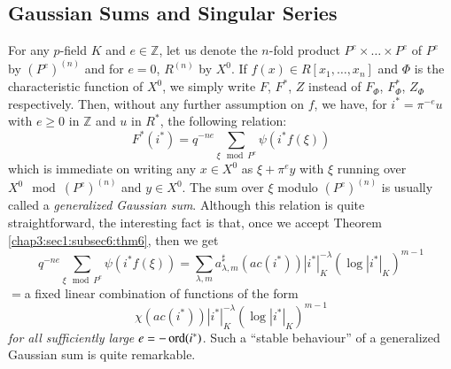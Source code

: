 \subsection{Gaussian Sums and Singular Series}\label{chap3:sec1:subsec7} %

For any $p$-field $K$ and $e\in\mathbb{Z}$, let us denote the $n$-fold
product $P^{e}\times\ldots\times P^{e}$ of $P^{e}$ by $(P^{e})^{(n)}$
and for $e=0$, $R^{(n)}$ by $X^{0}$. If $f(x)\in
R[x_{1},\ldots,x_{n}]$ and $\Phi$ is the characteristic function of
$X^{0}$, we simply write $F$, $F^{\ast}$, $Z$ instead of $F_{\Phi}$,
$F^{\ast}_{\Phi}$, $Z_{\Phi}$ respectively. Then, without any further
assumption on $f$, we have, for $i^{\ast}=\pi^{-e}u$ with $e\geq 0$ in
$\mathbb{Z}$ and $u$ in $R^{\ast}$, the following relation:
$$
F^{\ast}(i^{\ast})=q^{-ne}\sum_{\xi\mod P^{e}}\psi(i^{\ast}f(\xi))
$$
which is immediate on writing any $x\in X^{0}$ as $\xi+\pi^{e}y$ with
$\xi$ running over $X^{0}\mod(P^{e})^{(n)}$ and $y\in X^{0}$. The sum
over $\xi$ modulo $(P^{e})^{(n)}$ is usually called a {\em generalized
  Gaussian sum}. Although this relation is quite straightforward, the
interesting fact is that, once we accept Theorem
\ref{chap3:sec1:subsec6:thm6}, then we get
$$
q^{-ne}\sum_{\xi\mod
  P^{e}}\psi(i^{\ast}f(\xi))=\sum_{\lambda,m}a^{\sharp}_{\lambda,m} 
(ac(i^{\ast}))|i^{\ast}|^{-\lambda}_{K}(\log |i^{\ast}|_{K})^{m-1}
$$
$=$\pageoriginale a fixed linear combination of functions of the form
$$
\chi(ac(i^{\ast}))|i^{\ast}|^{-\lambda}_{K}(\log|i^{\ast}|_{K})^{m-1}
$$
{\em for all sufficiently large} $e=-\operatorname{ord} (i^{\ast})$. Such a ``stable
behaviour'' of a generalized Gaussian sum is quite remarkable.


